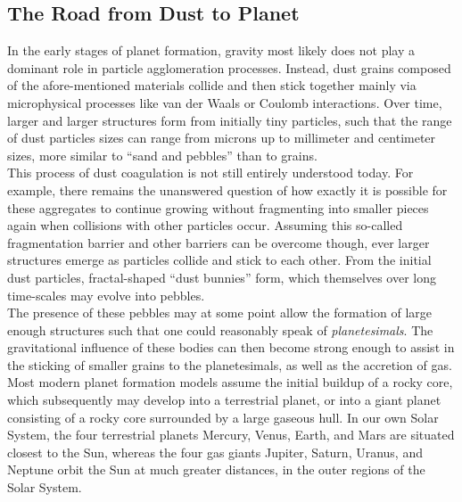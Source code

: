 \clearpage\subsection{The Road from Dust to Planet}

    In the early stages of planet formation, gravity most likely does not play a dominant role in 
    particle agglomeration processes. Instead, dust grains composed of the afore-mentioned 
    materials collide and then stick together mainly 
    via microphysical processes like van der Waals or Coulomb interactions. 
    Over time, larger and larger structures form from initially tiny particles, such that
    the range of dust particles sizes can range from microns up to 
    millimeter and centimeter sizes, more similar to ``sand and pebbles'' than to grains.
    \cite{natta_2006} \\

    This process of dust coagulation is not still entirely understood today. For example, 
    there remains the unanswered question of how exactly it is possible for these aggregates to 
    continue growing 
    without fragmenting into smaller pieces again when collisions with other particles occur.
    Assuming this so-called fragmentation barrier and other barriers can be overcome though, 
    ever larger structures emerge as particles collide and stick to each other. 
    From the initial dust particles, fractal-shaped 
    ``dust bunnies'' form, which themselves over long time-scales may evolve into pebbles. \\

    The presence of these pebbles may at some point allow
    the formation of large enough structures such that one could reasonably speak of
    \textit{planetesimals}. 
    The gravitational influence of these bodies can then become strong enough to 
    assist in the sticking of smaller grains to the planetesimals, as well as the 
    accretion of gas. \\

    Most modern planet formation models assume the initial buildup of a rocky core, which 
    subsequently may develop into a terrestrial planet, or into a giant planet consisting of a 
    rocky core surrounded by a large gaseous hull. 
    In our own Solar System, the
    four terrestrial planets 
    Mercury, Venus, Earth, and Mars
    are situated closest to the Sun, whereas the four gas giants 
    Jupiter, Saturn, Uranus, and Neptune 
    orbit the Sun at much greater distances, 
    in the outer regions of the Solar System. \\

